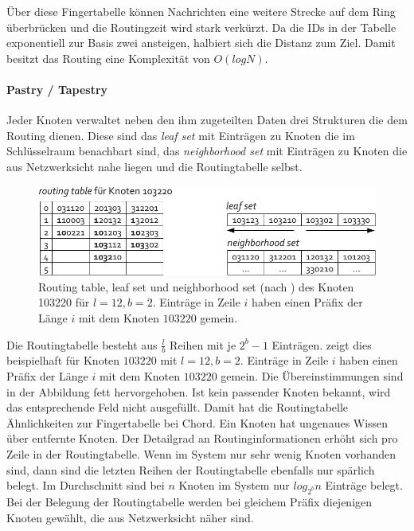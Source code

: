 Über diese Fingertabelle können Nachrichten eine weitere Strecke auf dem Ring überbrücken und die Routingzeit wird stark verkürzt. Da die IDs in der Tabelle exponentiell zur Basis zwei ansteigen, halbiert sich die Distanz zum Ziel. Damit besitzt das Routing eine Komplexität von $O(log N)$.

\paragraph{Pastry / Tapestry}
Jeder Knoten verwaltet neben den ihm zugeteilten Daten drei Strukturen die dem Routing dienen. Diese sind das \emph{leaf set} mit Einträgen zu Knoten die im Schlüsselraum benachbart sind, das \emph{neighborhood set} mit Einträgen zu Knoten die aus Netzwerksicht nahe liegen und die Routingtabelle selbst.

\begin{figure}[htbp]
\centering
\includegraphics{grafics/pastry_routing_table.pdf}
\caption{Routing table, leaf set und neighborhood set (nach \cite{Goetz2005}) des Knoten 103220 für $l=12, b=2$. Einträge in Zeile $i$ haben einen Präfix der Länge $i$ mit dem Knoten $103220$ gemein.}
\label{fig:pastry_routing_table}
\end{figure}

Die Routingtabelle besteht aus $\frac{l}{b}$ Reihen mit je $2^b -1$ Einträgen.  zeigt dies beispielhaft für Knoten $103220$ mit $l=12, b=2$. Einträge in Zeile $i$ haben einen Präfix der Länge $i$ mit dem Knoten $103220$ gemein. Die Übereinstimmungen sind in der Abbildung fett hervorgehoben. Ist kein passender Knoten bekannt, wird das entsprechende Feld nicht ausgefüllt. Damit hat die Routingtabelle Ähnlichkeiten zur Fingertabelle bei Chord. Ein Knoten hat ungenaues Wissen über entfernte Knoten. Der Detailgrad an Routinginformationen erhöht sich pro Zeile in der Routingtabelle. Wenn im System nur sehr wenig Knoten vorhanden sind, dann sind die letzten Reihen der Routingtabelle ebenfalls nur spärlich belegt. Im Durchschnitt sind bei $n$ Knoten im System nur $log_{2^b} n$ Einträge belegt.\\
Bei der Belegung der Routingtabelle werden bei gleichem Präfix diejenigen Knoten gewählt, die aus Netzwerksicht näher sind.

